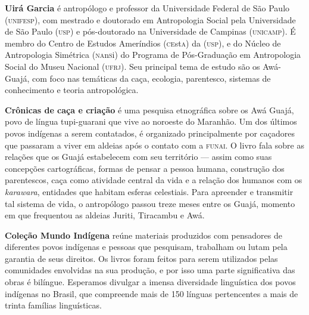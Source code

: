 \textbf{Uirá Garcia} é antropólogo e professor da Universidade Federal de São Paulo \textsc{(unifesp)}, com mestrado e doutorado em Antropologia Social pela Universidade de São Paulo \textsc{(usp)} e pós-doutorado na Universidade de Campinas \textsc{(unicamp)}. 
É membro do Centro de Estudos Ameríndios (\textsc{ce}st\textsc{a}) da \textsc{(usp)}, e do Núcleo de Antropologia Simétrica (\textsc{na}n\textsc{s}i) do Programa de Pós-Graduação em Antropologia Social do Museu Nacional (\textsc{ufrj}). Seu principal tema de estudo são os Awá-Guajá, com foco nas temáticas da caça, ecologia, parentesco, sistemas de conhecimento e teoria antropológica.
	
\textbf{Crônicas de caça e criação} é uma pesquisa etnográfica sobre os Awá Guajá, povo de língua tupi-guarani que vive ao noroeste do Maranhão. Um dos últimos povos indígenas a serem contatados, é organizado principalmente por caçadores que passaram a viver em aldeias após o contato com a \textsc{funai}. O livro fala sobre as relações que os Guajá estabelecem com seu território --- assim como suas concepções cartográficas, formas de pensar a pessoa humana, construção dos parentescos, caça como atividade central da vida e a relação dos humanos com os \emph{karawara}, entidades que habitam esferas celestiais. Para apreender e transmitir tal sistema de vida, o antropólogo passou treze meses entre os Guajá, momento em que frequentou as aldeias Juriti, Tiracambu e Awá.

\textbf{Coleção Mundo Indígena} reúne materiais produzidos com pensadores de diferentes povos indígenas e pessoas que pesquisam, trabalham ou lutam pela garantia de seus direitos. Os livros foram feitos para serem utilizados pelas comunidades envolvidas na sua produção, e por isso uma parte significativa das obras é bilíngue. Esperamos divulgar a imensa diversidade linguística dos povos indígenas no Brasil, que compreende mais de 150 línguas pertencentes a mais de trinta famílias linguísticas.



